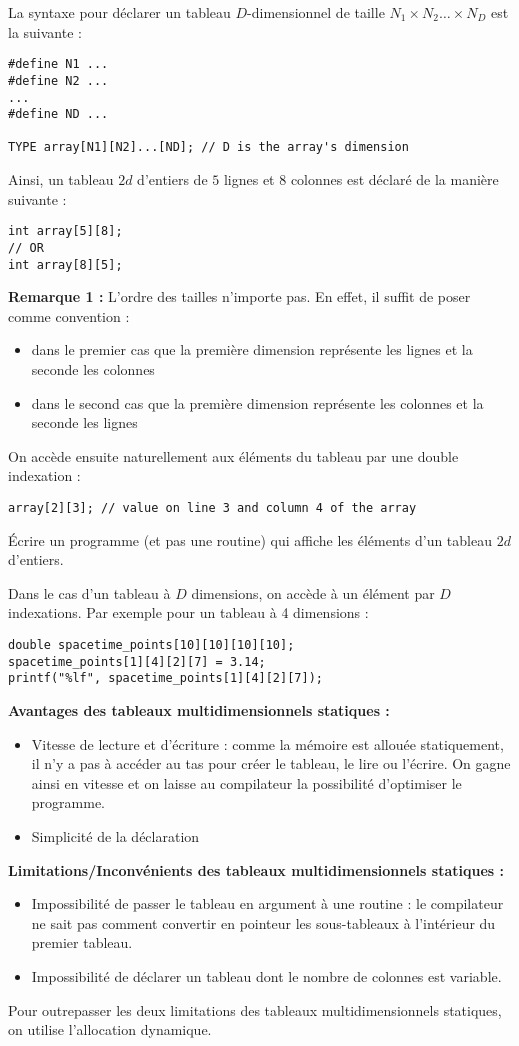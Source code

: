 \documentclass[../../../main.tex]{subfiles}
\begin{document}
La syntaxe pour déclarer un tableau $D$-dimensionnel de taille $N_{1}\times{N_{2}}\dots\times{N_{D}}$ est la suivante :
\begin{verbatim}
#define N1 ...
#define N2 ...
...
#define ND ...

TYPE array[N1][N2]...[ND]; // D is the array's dimension
\end{verbatim}
Ainsi, un tableau $2d$ d'entiers de $5$ lignes et 8 colonnes est déclaré de la manière suivante :
\begin{verbatim}
int array[5][8];
// OR
int array[8][5];
\end{verbatim}
\textbf{Remarque 1 :} L'ordre des tailles n'importe pas. En effet, il suffit de poser comme convention :
\begin{itemize}
	\item dans le premier cas que la première dimension représente les lignes et la seconde les colonnes
	\item dans le second cas que la première dimension représente les colonnes et la seconde les lignes
\end{itemize}
On accède ensuite naturellement aux éléments du tableau par une double indexation :
\begin{verbatim}
array[2][3]; // value on line 3 and column 4 of the array
\end{verbatim}
 Écrire un programme (et pas une routine) qui affiche les éléments d'un tableau $2d$ d'entiers.
 
Dans le cas d'un tableau à $D$ dimensions, on accède à un élément par $D$ indexations. Par exemple pour un tableau à 4 dimensions :
\begin{verbatim}
double spacetime_points[10][10][10][10];
spacetime_points[1][4][2][7] = 3.14;
printf("%lf", spacetime_points[1][4][2][7]);
\end{verbatim}
\textbf{Avantages des tableaux multidimensionnels statiques :}
\begin{itemize}
	\item Vitesse de lecture et d'écriture : comme la mémoire est allouée statiquement, il n'y a pas à accéder au tas pour créer le tableau, le lire ou l'écrire. On gagne ainsi en vitesse et on laisse au compilateur la possibilité d'optimiser le programme.
	\item Simplicité de la déclaration
\end{itemize}
\textbf{Limitations/Inconvénients des tableaux multidimensionnels statiques :}
\begin{itemize}
	\item Impossibilité de passer le tableau en argument à une routine : le compilateur ne sait pas comment convertir en pointeur les sous-tableaux à l'intérieur du premier tableau.
	\item Impossibilité de déclarer un tableau dont le nombre de colonnes est variable.
\end{itemize}
Pour outrepasser les deux limitations des tableaux multidimensionnels statiques, on utilise l'allocation dynamique.
\end{document}
